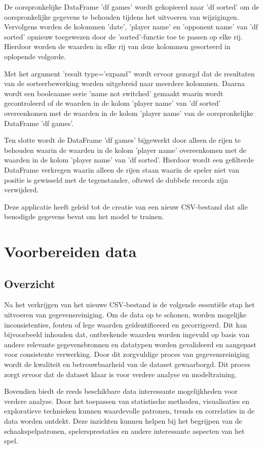 De oorspronkelijke DataFrame 'df games' wordt gekopieerd naar 'df sorted' om de oorspronkelijke gegevens te behouden tijdens het uitvoeren van wijzigingen. Vervolgens worden de kolommen 'date', 'player name' en 'opponent name' van 'df sorted' opnieuw toegewezen door de 'sorted'-functie toe te passen op elke rij. Hierdoor worden de waarden in elke rij van deze kolommen gesorteerd in oplopende volgorde.

Met het argument 'result type='expand'' wordt ervoor gezorgd dat de resultaten van de sorteerbewerking worden uitgebreid naar meerdere kolommen. Daarna wordt een booleaanse serie 'name not switched' gemaakt waarin wordt gecontroleerd of de waarden in de kolom 'player name' van 'df sorted' overeenkomen met de waarden in de kolom 'player name' van de oorspronkelijke DataFrame 'df games'.

Ten slotte wordt de DataFrame 'df games' bijgewerkt door alleen de rijen te behouden waarin de waarden in de kolom 'player name' overeenkomen met de waarden in de kolom 'player name' van 'df sorted'. Hierdoor wordt een gefilterde DataFrame verkregen waarin alleen de rijen staan waarin de speler niet van positie is gewisseld met de tegenstander, oftewel de dubbele records zijn verwijderd.

Deze applicatie heeft geleid tot de creatie van een nieuw CSV-bestand dat alle benodigde gegevens bevat om het model te trainen.

\section{Voorbereiden data}

\subsection{Overzicht}

Na het verkrijgen van het nieuwe CSV-bestand is de volgende essentiële stap het uitvoeren van gegevensreiniging. Om de data op te schonen, worden mogelijke inconsistenties, fouten of lege waarden geïdentificeerd en gecorrigeerd. Dit kan bijvoorbeeld inhouden dat, ontbrekende waarden worden ingevuld op basis van andere relevante gegevensbronnen en datatypen worden gevalideerd en aangepast voor consistente verwerking. Door dit zorgvuldige proces van gegevensreiniging wordt de kwaliteit en betrouwbaarheid van de dataset gewaarborgd. Dit proces zorgt ervoor dat de dataset klaar is voor verdere analyse en modeltraining. 

Bovendien biedt de reeds beschikbare data interessante mogelijkheden voor verdere analyse. Door het toepassen van statistische methoden, visualisaties en exploratieve technieken kunnen waardevolle patronen, trends en correlaties in de data worden ontdekt. Deze inzichten kunnen helpen bij het begrijpen van de schaakspelpatronen, spelersprestaties en andere interessante aspecten van het spel. 

